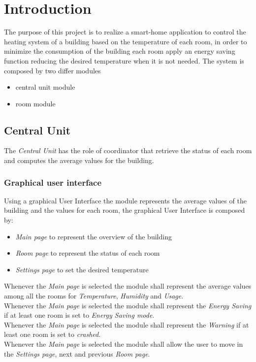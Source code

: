 \section{Introduction}
The purpose of this project is to realize a smart-home application to control the heating system of a building based on the temperature of each room, in order to minimize the consumption of the building each room apply an energy saving function reducing the desired temperature when it is not needed.
The system is composed by two differ modules
\begin{itemize}
	\item central unit module 
	\item room module
\end{itemize}

\subsection{Central Unit}
The \textit{Central Unit} has the role of coordinator that retrieve the status of each room and computes the average values for the building.\\

\subsubsection{Graphical user interface}
Using a graphical User Interface the module represents the average values of the building and the values for each room, the graphical User Interface is composed by:
\begin{itemize}
	\item \textit{Main page} to represent the overview of the building
	\item \textit{Room page} to represent the status of each room
	\item \textit{Settings page} to set the desired temperature
\end{itemize}

Whenever the \textit{Main page} is selected the module shall represent the average values among all the rooms for \textit{Temperature}, \textit{Humidity} and \textit{Usage}.\\
Whenever the \textit{Main page} is selected the module shall represent the \textit{Energy Saving} if at least one room is set to \textit{Energy Saving mode}.\\
Whenever the \textit{Main page} is selected the module shall represent the \textit{Warning} if at least one room is set to \textit{crashed}.\\
Whenever the \textit{Main page} is selected the module shall allow the user to move in the \textit{Settings page}, next and previous \textit{Room page}.\\

